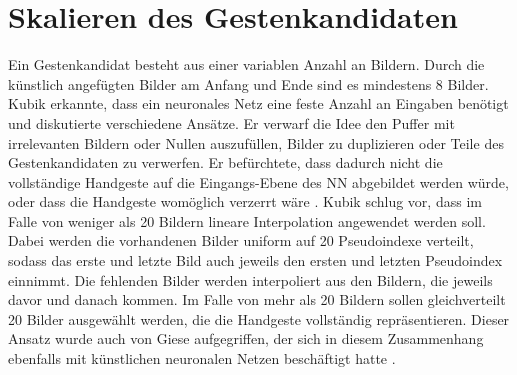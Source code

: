 \section{Skalieren des Gestenkandidaten}
\label{sec:scaling}
Ein Gestenkandidat besteht aus einer variablen Anzahl an Bildern. Durch die künstlich angefügten Bilder am Anfang und Ende sind es mindestens 8 Bilder. Kubik erkannte, dass ein neuronales Netz eine feste Anzahl an
Eingaben benötigt und diskutierte verschiedene Ansätze. Er verwarf die Idee den Puffer mit irrelevanten Bildern oder Nullen auszufüllen, Bilder zu duplizieren oder Teile des Gestenkandidaten zu verwerfen. Er
befürchtete, dass dadurch nicht die vollständige Handgeste auf die Eingangs-Ebene des NN abgebildet werden würde, oder dass die Handgeste womöglich verzerrt wäre \cite{kubikThesis}.
\newline
\newline
Kubik schlug vor, dass im Falle von weniger als 20 Bildern lineare Interpolation angewendet werden soll. Dabei werden die vorhandenen Bilder uniform auf 20 Pseudoindexe verteilt, sodass das erste und letzte Bild auch
jeweils den ersten und letzten Pseudoindex einnimmt. Die fehlenden Bilder werden interpoliert aus den Bildern, die jeweils davor und danach kommen.
\newline
\newline
Im Falle von mehr als 20 Bildern sollen gleichverteilt 20 Bilder ausgewählt werden, die die Handgeste vollständig repräsentieren. Dieser Ansatz wurde auch von Giese aufgegriffen, der sich in diesem Zusammenhang
ebenfalls mit künstlichen neuronalen Netzen beschäftigt hatte \cite{gieseThesis}.